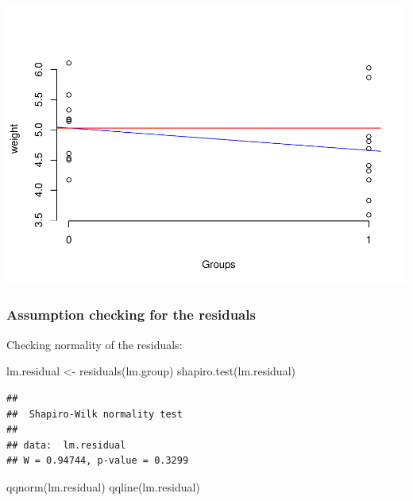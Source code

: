 \documentclass[
]{book}
\newenvironment{Shaded}{\begin{snugshade}}{\end{snugshade}}
\newcommand{\FunctionTok}[1]{\textcolor[rgb]{0.00,0.00,0.00}{#1}}
\newcommand{\NormalTok}[1]{#1}
\newcommand{\OtherTok}[1]{\textcolor[rgb]{0.56,0.35,0.01}{#1}}
\begin{document}
\includegraphics{SurveyBook_files/figure-latex/simpleAnalysisplot-1.pdf}

\hypertarget{assumption-checking-for-the-residuals}{%
\subsubsection{Assumption checking for the residuals}\label{assumption-checking-for-the-residuals}}

Checking normality of the residuals:

\begin{Shaded}
\begin{Highlighting}[]
\NormalTok{lm.residual }\OtherTok{\textless{}{-}} \FunctionTok{residuals}\NormalTok{(lm.group)}
\FunctionTok{shapiro.test}\NormalTok{(lm.residual)}
\end{Highlighting}
\end{Shaded}

\begin{verbatim}
## 
##  Shapiro-Wilk normality test
## 
## data:  lm.residual
## W = 0.94744, p-value = 0.3299
\end{verbatim}

\begin{Shaded}
\begin{Highlighting}[]
\FunctionTok{qqnorm}\NormalTok{(lm.residual)}
\FunctionTok{qqline}\NormalTok{(lm.residual)}
\end{Highlighting}
\end{Shaded}
\end{document}
